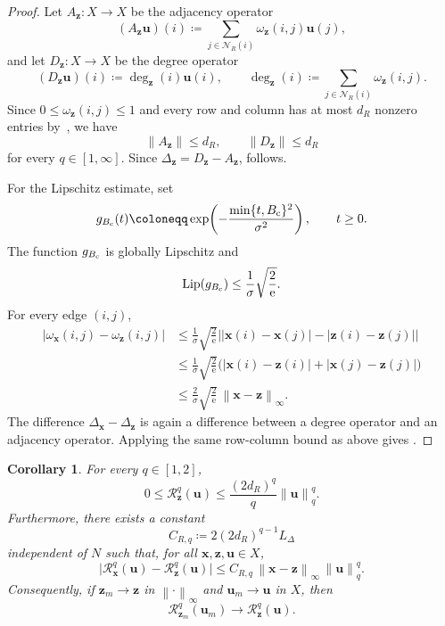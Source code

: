 \documentclass{article}
\newtheorem{corollary}[theorem]{Corollary}
\theoremstyle{remark}
\newcommand{\norm}[1]{\left\lVert #1 \right\rVert}
\newcommand{\Rreg}{\mathcal{R}}
\newcommand{\Ncal}{\mathcal{N}}
\newcommand{\bx}{{\bm{x}}}
\newcommand{\bz}{{\bm{z}}}
\newcommand{\bu}{{\bm{u}}}
\begin{document}
\begin{proof}
Let $A_\bz \colon X \to X$ be the adjacency operator
\[
(A_\bz \bu)(i)\coloneqq\sum_{j\in\Ncal_R(i)}\omega_\bz(i,j)\bu(j),
\]
and let $D_\bz \colon X \to X$ be the degree operator
\[
(D_\bz \bu)(i) \coloneqq \operatorname{deg}_\bz(i)\bu(i), \qquad \operatorname{deg}_\bz(i)\coloneqq\sum_{j\in\Ncal_R(i)}\omega_\bz(i,j).
\]
Since $0\le \omega_\bz(i,j)\le1$ and every row and column has at most $d_R$ nonzero entries by~, we have
\[
\norm{A_\bz}\le d_R,
\qquad
\norm{D_\bz}\le d_R
\]
for every $q\in[1,\infty]$. Since $\Delta_\bz=D_\bz-A_\bz$,  follows.

 

For the Lipschitz estimate, set
\[
g_{B_{\rm c}}(t)\coloneqq
\exp\!\left(-\frac{\min\{t,B_{\rm c}\}^2}{\sigma^2}\right),
\qquad t\ge0.
\]
The function $g_{B_{\rm c}}$ is globally Lipschitz and
\[
\operatorname{Lip}(g_{B_{\rm c}})
\le\frac1\sigma\sqrt{\frac{2}{\mathrm{e}}}.
\]
For every edge $(i,j)$,
\[
\begin{aligned}
|\omega_\bx(i,j)-\omega_\bz(i,j)|
&\le \frac1\sigma\sqrt{\frac{2}{\mathrm{e}}}
\bigl||\bx(i)-\bx(j)|-|\bz(i)-\bz(j)|\bigr|  \\
&\le \frac1\sigma\sqrt{\frac{2}{\mathrm{e}}}
\bigl(|\bx(i)-\bz(i)|+|\bx(j)-\bz(j)|\bigr) \\
&\le \frac{2}{\sigma}\sqrt{\frac{2}{\mathrm{e}}}\,\norm{\bx-\bz}_\infty.
\end{aligned}
\]
The difference $\Delta_\bx-\Delta_\bz$ is again a difference between a degree operator and an adjacency operator. Applying the same row-column bound as above gives .
\end{proof}

\begin{corollary}\label{cor:R-bounds}
For every $q\in[1,2]$,
\begin{equation}\label{eq:R-uniform-bound}
0\le \Rreg_\bz^q(\bu)\le \frac{(2d_R)^q}{q}\norm{\bu}_q^q .
\end{equation}
Furthermore, there exists a constant
\[
C_{R,q}\coloneqq2(2d_R)^{q-1}L_\Delta
\]
independent of $N$ such that, for all $\bx,\bz,\bu\in X$,
\begin{equation}\label{eq:R-Lipschitz-guide}
\bigl|\Rreg_\bx^q(\bu)-\Rreg_\bz^q(\bu)\bigr|
\le C_{R,q}\,\norm{\bx-\bz}_\infty\,\norm{\bu}_q^q .
\end{equation}
Consequently, if $\bz_m\to \bz$ in $\norm{\cdot}_\infty$ and $\bu_m\to \bu$ in $X$, then
\begin{equation}\label{eq:R-continuity}
\Rreg_{\bz_m}^q(\bu_m)\to \Rreg_\bz^q(\bu).
\end{equation}
\end{corollary}
\end{document}
